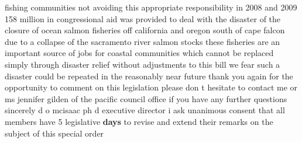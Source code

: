 \documentclass{article}
\begin{document}
fishing communities not avoiding this appropriate responsibility in 2008 and 2009 158 million in congressional aid was provided to deal with the disaster of the closure of ocean salmon fisheries off california and oregon south of cape falcon due to a collapse of the sacramento river salmon stocks these fisheries are an important source of jobs for coastal communities which cannot be replaced simply through disaster relief without adjustments to this bill we fear such a disaster could be repeated in the reasonably near future thank you again for the opportunity to comment on this legislation please don t hesitate to contact me or ms jennifer gilden of the pacific council office if you have any further questions sincerely d o mcisaac ph d executive director
\vspace{8mm}
i ask unanimous consent that all members have 5 legislative {\bf \color{red} days} to revise and extend their remarks on the subject of this special order
\vspace{8mm}
\end{document}

